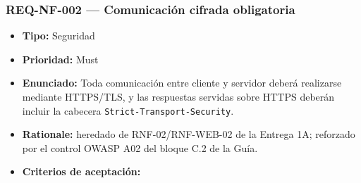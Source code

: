 \documentclass[
  spanish,
]{article}
\providecommand{\tightlist}{%
  \setlength{\itemsep}{0pt}\setlength{\parskip}{0pt}}
\begin{document}
\subsubsection{REQ-NF-002 --- Comunicación cifrada
obligatoria}\label{req-nf-002-comunicaciuxf3n-cifrada-obligatoria}

\begin{itemize}
\tightlist
\item
  \textbf{Tipo:} Seguridad
\item
  \textbf{Prioridad:} Must
\item
  \textbf{Enunciado:} Toda comunicación entre cliente y servidor deberá
  realizarse mediante HTTPS/TLS, y las respuestas servidas sobre HTTPS
  deberán incluir la cabecera \texttt{Strict-\allowbreak{}Transport-\allowbreak{}Security}.
\item
  \textbf{Rationale:} heredado de RNF-02/RNF-WEB-02 de la Entrega 1A;
  reforzado por el control OWASP A02 del bloque C.2 de la Guía.
\item
  \textbf{Criterios de aceptación:}


\end{itemize}
\end{document}
